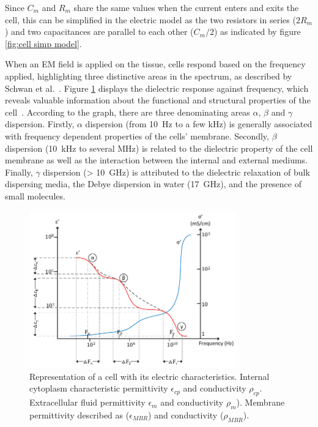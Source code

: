 Since $C_m$ and $R_m$ share the same values when the current enters and exits the cell, this can be simplified in the electric model as the two resistors in series ($2R_m$) and two capacitances are parallel to each other ($C_m/2$) as indicated by figure \ref{fig:cell simp model}.

When an EM field is applied on the tissue, cells respond based on the frequency applied, highlighting three distinctive areas in the spectrum, as described by Schwan et al.~\cite{schwan1957electrical,schwan1962electrical}. Figure \ref{fig:ABG dispersion} displays the dielectric response against frequency, which reveals valuable information about the functional and structural properties of the cell~\cite{lvovich2012impedance}. According to the graph, there are three denominating areas $\alpha$, $\beta$ and $\gamma$ dispersion. Firstly, $\alpha$ dispersion (from \SI{10}{\hertz} to a few \si{\kilo\hertz}) is generally associated with frequency dependent properties of the cells' membrane. Secondly, $\beta$ dispersion (\SI{10}{\kilo\hertz} to several \si{\mega\hertz}) is related to the dielectric property of the cell membrane as well as the interaction between the internal and external mediums. Finally, $\gamma$ dispersion (> \SI{10}{\giga\hertz}) is attributed to the dielectric relaxation of bulk dispersing media, the Debye dispersion in water (\SI{17}{\giga\hertz}), and the presence of small molecules. 

\begin{figure}[!htpb]
	\centering
	\includegraphics[width=0.8\textwidth,keepaspectratio, trim={0cm 1cm 0cm 0cm},clip]{figure3}    
	\caption[Alpha, Bet y Gama dispersion]{Representation of a cell with its electric characteristics. Internal cytoplasm characteristic permittivity $\epsilon_{cp}$ and conductivity $\rho_{cp}$. Extracellular fluid permittivity $\epsilon_m$ and conductivity $\rho_m$). Membrane permittivity described as ($\epsilon_{MBR}$) and conductivity ($\rho_{MBR}$).}
	\label{fig:ABG dispersion}
\end{figure}

